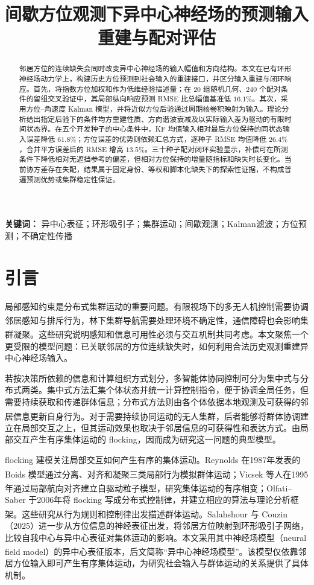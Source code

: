 \documentclass[UTF8,fontset=windows,11pt]{ctexart}
\title{间歇方位观测下异中心神经场的\newline 预测输入重建与配对评估}
\author{}
\date{}
\makeatletter
\renewcommand{\maketitle}{\begin{center}\vspace*{-1em}{\LARGE\bfseries\@title\par}\vspace{1em}\end{center}}
\newcommand{\upcite}[1]{\textsuperscript{\cite{#1}}}
\makeatother
\begin{document}
\maketitle

\begin{abstract}
邻居方位的连续缺失会同时改变异中心神经场的输入幅值和方向结构。本文在已有环形神经场动力学上，构建历史方位预测到社会输入的重建接口，并区分输入重建与闭环响应。首先，将指数方位加权和作为低维经验描述量；在 $20$ 组随机几何、$240$ 个配对条件的留组交叉验证中，其局部纵向响应预测 RMSE 比总幅值基准低 $16.1\%$。其次，采用方位--角速度 Kalman 模型，并将近似方位后验通过周期核卷积映射为输入。理论分析给出指定后验下的条件均方重建性质、方向谐波衰减及以实际输入差为驱动的有限时间状态界。在五个开发种子的中心条件中，KF 均值输入相对最后方位保持的同状态输入误差降低 $61.8\%$；方位误差的优势则依赖汇总方式，逐种子 RMSE 均值降低 $26.4\%$，合并平方误差后的 RMSE 增高 $13.5\%$。三十种子配对闭环实验显示，补偿可在所测条件下降低相对无遮挡参考的偏差，但相对方位保持的增量随指标和缺失时长变化。当前协方差存在失配，结果属于固定身份、等权和脚本化缺失下的探索性证据，不构成普遍预测优势或集群稳定性保证。

\end{abstract}

\noindent\textbf{关键词：} 异中心表征；环形吸引子；集群运动；间歇观测；Kalman滤波；方位预测；不确定性传播

\section{引言}

局部感知约束是分布式集群运动的重要问题。有限视场下的多无人机控制需要协调邻居感知与排斥行为\upcite{Bai2024}，林下集群导航需要处理环境不确定性\upcite{Boldrer2026}，通信障碍也会影响集群凝聚\upcite{LiFlocking2024}。这些研究说明感知和信息可用性必须与交互机制共同考虑。本文聚焦一个更受限的模型问题：已关联邻居的方位连续缺失时，如何利用合法历史观测重建异中心神经场输入。

若按决策所依赖的信息和计算组织方式划分，多智能体协同控制可分为集中式与分布式两类。集中式方法汇集个体状态并统一计算控制指令，便于协调全局任务，但需要持续获取和传递群体信息；分布式方法则由各个体依据本地观测及可获得的邻居信息更新自身行为\upcite{OlfatiSaber2006}。对于需要持续协同运动的无人集群，后者能够将群体协调建立在局部交互之上，但其运动效果也取决于邻居信息的可获得性和表达方式。由局部交互产生有序集体运动的 flocking，因而成为研究这一问题的典型模型。

flocking 建模关注局部交互如何产生有序的集体运动。Reynolds 在1987年发表的 Boids 模型通过分离、对齐和凝聚三类局部行为模拟群体运动\upcite{Reynolds1987}；Vicsek 等人在1995年通过局部航向对齐建立自驱动粒子模型，研究集体运动的有序相变\upcite{Vicsek1995}；Olfati--Saber 于2006年将 flocking 写成分布式控制律，并建立相应的算法与理论分析框架\upcite{OlfatiSaber2006}。这些研究从行为规则和控制律出发描述群体运动。Salahshour 与 Couzin（2025）进一步从方位信息的神经表征出发，将邻居方位映射到环形吸引子网络，比较自我中心与异中心表征对集体运动的影响。本文采用其中神经场模型（neural field model）的异中心表征版本，后文简称“异中心神经场模型”\upcite{Salahshour2025}。该模型仅依靠邻居方位输入即可产生有序集体运动，为研究社会输入与群体运动的关系提供了具体机制。
\end{document}
